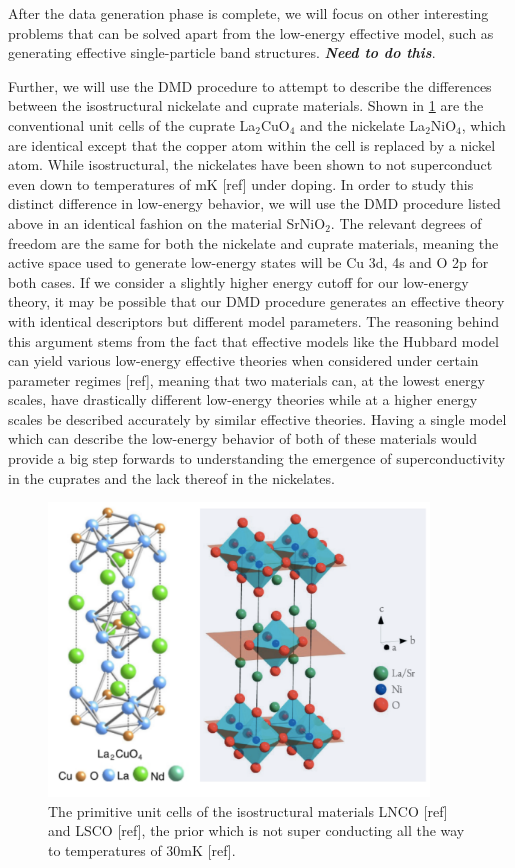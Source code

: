 \documentclass{article}
\begin{document}
After the data generation phase is complete, we will focus on other interesting problems that can be solved apart from the low-energy effective model, such as generating effective single-particle band structures. \textit{\textbf{Need to do this}}.

Further, we will use the DMD procedure to attempt to describe the differences between the isostructural nickelate and cuprate materials. 
Shown in \ref{fig6} are the conventional unit cells of the cuprate La$_2$CuO$_4$ and the nickelate La$_2$NiO$_4$, which are identical except that the copper atom within the cell is replaced by a nickel atom. 
While isostructural, the nickelates have been shown to not superconduct even down to temperatures of mK [ref] under doping. 
In order to study this distinct difference in low-energy behavior, we will use the DMD procedure listed above in an identical fashion on the material SrNiO$_2$. 
The relevant degrees of freedom are the same for both the nickelate and cuprate materials, meaning the active space used to generate low-energy states will be Cu 3d, 4s and O 2p for both cases. 
If we consider a slightly higher energy cutoff for our low-energy theory, it may be possible that our DMD procedure generates an effective theory with identical descriptors but different model parameters. 
The reasoning behind this argument stems from the fact that effective models like the Hubbard model can yield various low-energy effective theories when considered under certain parameter regimes [ref], meaning that two materials can, at the lowest energy scales, have drastically different low-energy theories while at a higher energy scales be described accurately by similar effective theories. 
Having a single model which can describe the low-energy behavior of both of these materials would provide a big step forwards to understanding the emergence of superconductivity in the cuprates and the lack thereof in the nickelates. 

\begin{figure}[H]
\centering
\includegraphics[width=0.9\textwidth]{Figures/P2-Ni_Cu.pdf}
\caption{\label{fig6} The primitive unit cells of the isostructural materials LNCO [ref] and LSCO [ref], the prior which is not super conducting all the way to temperatures of 30mK [ref].}
\end{figure}
\end{document}
